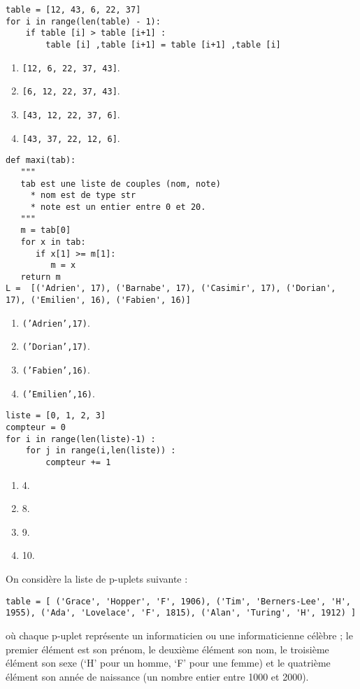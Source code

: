 \begin{lstlisting}
table = [12, 43, 6, 22, 37]
for i in range(len(table) - 1):
    if table [i] > table [i+1] :
        table [i] ,table [i+1] = table [i+1] ,table [i]
\end{lstlisting}
\begin{enumerate}
\item \texttt{[12, 6, 22, 37, 43]}. %
\item \texttt{[6, 12, 22, 37, 43]}.
\item \texttt{[43, 12, 22, 37, 6]}.
\item \texttt{[43, 37, 22, 12, 6]}.
\end{enumerate}


\begin{lstlisting}
def maxi(tab):
   """
   tab est une liste de couples (nom, note)
     * nom est de type str
     * note est un entier entre 0 et 20.
   """
   m = tab[0]
   for x in tab:
      if x[1] >= m[1]:
         m = x
   return m
L =  [('Adrien', 17), ('Barnabe', 17), ('Casimir', 17), ('Dorian', 17), ('Emilien', 16), ('Fabien', 16)]
\end{lstlisting}
\begin{enumerate}
\item \texttt{('Adrien',17)}.
\item \texttt{('Dorian',17)}. %
\item \texttt{('Fabien',16)}.
\item \texttt{('Emilien',16)}.
\end{enumerate}


\begin{lstlisting}
liste = [0, 1, 2, 3]
compteur = 0
for i in range(len(liste)-1) :
    for j in range(i,len(liste)) :
        compteur += 1
\end{lstlisting}
\begin{enumerate}
\item 4.
\item 8.
\item 9. %
\item 10.
\end{enumerate}

\question{}
On considère la liste de p-uplets suivante :
\begin{lstlisting}
table = [ ('Grace', 'Hopper', 'F', 1906), ('Tim', 'Berners-Lee', 'H', 1955), ('Ada', 'Lovelace', 'F', 1815), ('Alan', 'Turing', 'H', 1912) ]
\end{lstlisting}
où chaque p-uplet représente un informaticien ou une informaticienne célèbre ; le premier élément est son prénom, le deuxième élément son nom, le troisième élément son sexe (‘H’ pour un homme, ‘F’ pour une femme) et le quatrième élément son année de naissance (un nombre entier entre 1000 et 2000).

